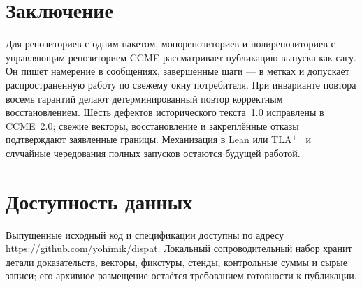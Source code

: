 \documentclass[sigconf,nonacm]{acmart}
\theoremstyle{acmplain}
\theoremstyle{acmdefinition}
\theoremstyle{acmplain}
\begin{document}
\section{Заключение}
\label{sec:conclusion}

Для репозиториев с одним пакетом, монорепозиториев и полирепозиториев с
управляющим репозиторием CCME рассматривает публикацию выпуска как сагу.
Он пишет намерение в сообщениях, завершённые шаги --- в метках и допускает
распространённую работу по свежему окну потребителя. При инварианте повтора
восемь гарантий делают детерминированный повтор корректным восстановлением.
Шесть дефектов исторического текста~1.0 исправлены в CCME~2.0; свежие векторы,
восстановление и закреплённые отказы подтверждают заявленные границы.
Механизация в Lean или TLA$^{+}$~\cite{lamport} и случайные чередования полных
запусков остаются будущей работой.

\section*{Доступность данных}

Выпущенные исходный код и спецификации доступны по адресу
\url{https://github.com/yohimik/dispat}. Локальный сопроводительный набор
хранит детали доказательств, векторы, фикстуры, стенды, контрольные суммы и
сырые записи; его архивное размещение остаётся требованием готовности к
публикации.
\end{document}
